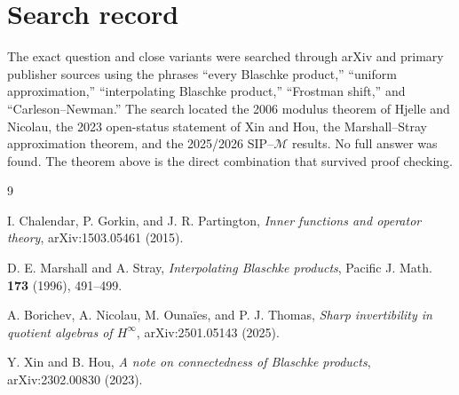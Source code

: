\documentclass[10pt]{article}
\newcommand{\M}{\mathcal M}
\begin{document}
\section*{Search record}

The exact question and close variants were searched through arXiv and primary
publisher sources using the phrases ``every Blaschke product,'' ``uniform
approximation,'' ``interpolating Blaschke product,'' ``Frostman shift,'' and
``Carleson--Newman.''  The search located the 2006 modulus theorem of Hjelle
and Nicolau, the 2023 open-status statement of Xin and Hou, the
Marshall--Stray approximation theorem, and the 2025/2026 SIP--$\M$ results.
No full answer was found.  The theorem above is the direct combination that
survived proof checking.

\begin{thebibliography}{9}

I. Chalendar, P. Gorkin, and J. R. Partington,
\emph{Inner functions and operator theory}, arXiv:1503.05461 (2015).

D. E. Marshall and A. Stray,
\emph{Interpolating Blaschke products},
Pacific J. Math. \textbf{173} (1996), 491--499.

A. Borichev, A. Nicolau, M. Ouna\"ies, and P. J. Thomas,
\emph{Sharp invertibility in quotient algebras of $H^\infty$},
arXiv:2501.05143 (2025).

Y. Xin and B. Hou,
\emph{A note on connectedness of Blaschke products},
arXiv:2302.00830 (2023).

\end{thebibliography}
\end{document}
